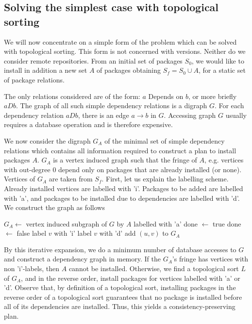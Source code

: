 \documentclass[a4paper,11pt]{article}
\begin{document}
\subsection{Solving the simplest case with topological sorting}

We will now concentrate on a simple form of the problem which can be
solved with topological sorting. This form is not concerned with
versions. Neither do we consider remote repositories.  From an initial
set of packages $S_0$, we would like to install in addition a new set
$A$ of packages obtaining $S_f = S_0 \cup A$, for a static set of package
relations.

The only relations considered are of the form: $a$ Depends on $b$, or
more briefly $aDb$. The graph of all such simple dependency relations
is a digraph $G$.  For each dependency relation $aDb$, there is an
edge $a \to b$ in $G$.  Accessing graph $G$ usually requires a database
operation and is therefore expensive.

We now consider the digraph $G_A$ of the minimal set of simple
dependency relations which contains all information required to
construct a plan to install packages $A$. $G_A$ is a vertex induced
graph such that the fringe of $A$, e.g. vertices with out-degree $0$
depend only on packages that are already installed (or none). Vertices
of $G_A$ are taken from $S_f$. First, let us explain the labelling
scheme.  Already installed vertices are labelled with 'i'. Packages to
be added are labelled with 'a', and packages to be installed due to
dependencies are labelled with 'd'. We construct the graph as follows
\begin{algorithm}
  \caption{$\textsc{Make-}G_A(G, A)$}
  \label{alg:cons-graph}
  \begin{algorithmic}[1]
\STATE $G_A \gets$ vertex induced subgraph of $G$ by $A$ labelled with 'a'
\REPEAT
  \STATE done $\gets$ true
        \STATE done $\gets$ false
          \STATE label $v$ with 'i'
        \ELSE
          \STATE label $v$ with 'd'
        \ENDIF
        \STATE add $(u,v)$ to $G_A$
       \ENDIF
     \ENDFOR
  \ENDFOR
{}
\end{algorithmic}
\end{algorithm}

By this iterative expansion, we do a minimum number of database
accesses to $G$ and construct a dependency graph in memory. If the
$G_A$'s fringe has vertices with non 'i'-labels, then $A$ cannot be
installed. Otherwise, we find a topological sort $L$ of $G_A$, and in
the reverse order, install packages for vertices labelled with
'a' or 'd'. Observe that, by definition of a topological sort,
installing packages in the reverse order of a topological sort
guarantees that no package is installed before all of its dependencies
are installed. Thus, this yields a consistency-preserving plan.
\end{document}

